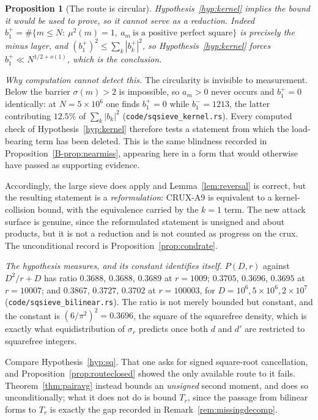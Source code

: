 \documentclass[11pt]{article}
\newtheorem{proposition}[theorem]{Proposition}
\theoremstyle{definition}
\begin{document}
\begin{proposition}[The route is circular]\label{prop:circular}
Hypothesis~\textup{\ref{hyp:kernel}} implies the bound it would be used to prove, so it cannot serve
as a reduction. Indeed $b^{+}_1=\#\{m\le N:\ \mu^2(m)=1,\ a_m\ \text{is a positive perfect square}\}$ is precisely
the minus layer, and $(b^{+}_1)^2\le\sum_k|b^{+}_k|^2$, so
Hypothesis~\textup{\ref{hyp:kernel}} forces $b^{+}_1\ll N^{1/2+o(1)}$, which is the conclusion.
\end{proposition}

\emph{Why computation cannot detect this.} The circularity is invisible to measurement. Below the barrier $\sigma(m)>2$ is impossible, so
$a_m>0$ never occurs and $b^{+}_1=0$ identically: at $N=5\times10^6$ one finds $b^{+}_1=0$ while
$b^{-}_1=1213$, the latter contributing $12.5\%$ of $\sum_k|b_k|^2$
\textup{(\texttt{code/sqsieve\_kernel.rs})}. Every computed check of
Hypothesis~\ref{hyp:kernel} therefore tests a statement from which the load-bearing term has been
deleted. This is the same blindness recorded in Proposition~\ref{B-prop:nearmiss}, appearing here in a
form that would otherwise have passed as supporting evidence.

Accordingly, the large sieve does apply and Lemma~\ref{lem:reversal} is correct, but the resulting
statement is a \emph{reformulation}: $\mathrm{CRUX}\text{-}\mathrm{A}9$ is equivalent to a kernel-collision
bound, with the equivalence carried by the $k=1$ term. The new attack surface is genuine, since the
reformulated statement is unsigned and about products, but it is not a reduction and is not counted
as progress on the crux. The unconditional record is Proposition~\ref{prop:condrate}.


\emph{The hypothesis measures, and its constant identifies itself.} $P(D,r)$ against $D^2/r+D$ has ratio $0.3688$, $0.3688$, $0.3689$ at $r=1009$;
$0.3705$, $0.3696$, $0.3695$ at $r=10007$; and $0.3867$, $0.3727$, $0.3702$ at $r=100003$, for
$D=10^6,5\times10^6,2\times10^7$ \textup{(\texttt{code/sqsieve\_bilinear.rs})}. The ratio is not
merely bounded but constant, and the constant is $(6/\pi^2)^2=0.3696$, the square of the squarefree
density, which is exactly what equidistribution of $\sigma_r$ predicts once both $d$ and $d'$ are
restricted to squarefree integers.

Compare Hypothesis~\ref{hyp:sq}. That one asks for signed square-root
cancellation, and Proposition~\ref{prop:routeclosed} showed the only available route to it fails.
Theorem~\ref{thm:pairavg} instead bounds an \emph{unsigned} second moment, and does so
unconditionally; what it does not do is bound $T_r$, since the passage from bilinear forms to $T_r$
is exactly the gap recorded in Remark~\ref{rem:missingdecomp}.
\end{document}
